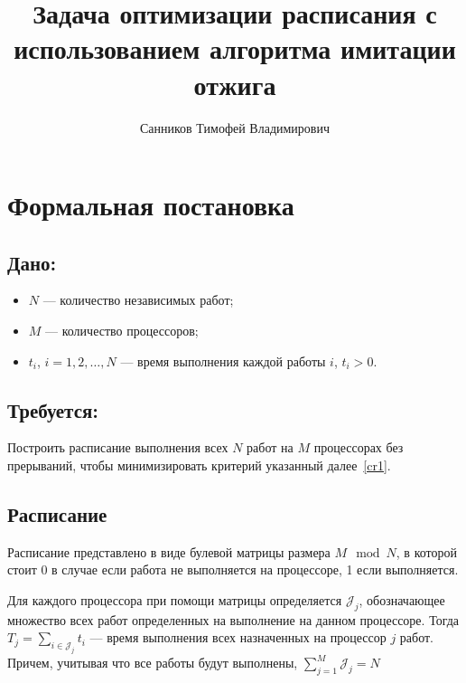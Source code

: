 \documentclass[openany, twoside, a4paper, 12pt]{extbook}
\title{Задача оптимизации расписания с использованием алгоритма имитации отжига}
\author{Санников Тимофей Владимирович}
\begin{document}
	\maketitle
	\section*{Формальная постановка}
	\subsection*{Дано:}
	
	\begin{itemize}
	    \item \( N \) — количество независимых работ;
	    \item \( M \) — количество процессоров;
	    \item \( t_i \), \( i = 1, 2, \dots, N \) — время выполнения каждой работы \( i \), \( t_i > 0 \).
	\end{itemize}
	
	\subsection*{Требуется:}
	
	Построить расписание выполнения всех
	\( N \) работ на \( M \) процессорах без прерываний,
	чтобы минимизировать критерий указанный далее~\ref{cr1}.


	\subsection*{Расписание}

	Расписание представлено в виде булевой матрицы размера $ M \mod N $,
	в которой стоит 0 в случае если работа не выполняется на процессоре,
	1 если выполняется.

	Для каждого процессора при помощи матрицы определяется $ \mathcal{J}_j $,
	обозначающее множество всех работ определенных на выполнение на данном процессоре.
	Тогда $ T_j = \sum_{i \in \mathcal{J}_j} t_i $ --- время выполнения всех назначенных на процессор \( j \) работ.
	Причем, учитывая что все работы будут выполнены, $ \sum_{j=1}^{M} \mathcal{J}_j = N$
\end{document}
